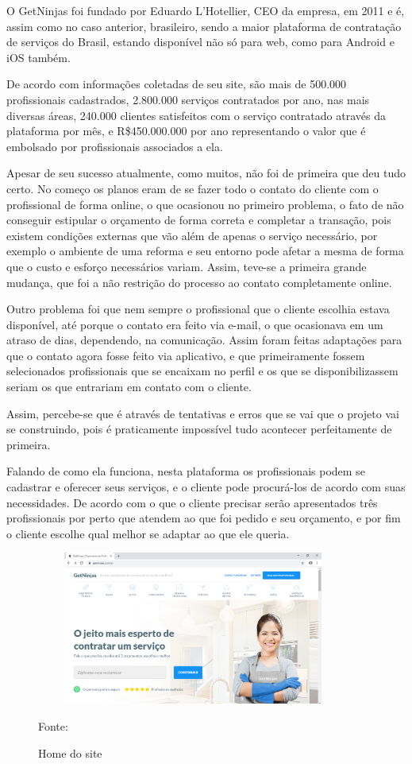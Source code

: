 O GetNinjas foi fundado por Eduardo L’Hotellier, CEO da empresa, em 2011 e é, assim como no caso anterior, brasileiro, sendo a maior plataforma de contratação de serviços do Brasil, estando disponível não só para web, como para Android e iOS também.

De acordo com informações coletadas de seu site, são mais de 500.000 profissionais cadastrados, 2.800.000 serviços contratados por ano, nas mais diversas áreas, 240.000 clientes satisfeitos com o serviço contratado através da plataforma por mês, e R\$450.000.000 por ano representando o valor que é embolsado por profissionais associados a ela.

Apesar de seu sucesso atualmente, como muitos, não foi de primeira que deu tudo certo. No começo os planos eram de se fazer todo o contato do cliente com o profissional de forma online, o que ocasionou no primeiro problema, o fato de não conseguir estipular o orçamento de forma correta e completar a transação, pois existem condições externas que vão além de apenas o serviço necessário, por exemplo o ambiente de uma reforma e seu entorno pode afetar a mesma de forma que o custo e esforço necessários variam. Assim, teve-se a primeira grande mudança, que foi a não restrição do processo ao contato completamente online.

Outro problema foi que nem sempre o profissional que o cliente escolhia estava disponível, até porque o contato era feito via e-mail, o que ocasionava em um atraso de dias, dependendo, na comunicação. Assim foram feitas adaptações para que o contato agora fosse feito via aplicativo, e que primeiramente fossem selecionados profissionais que se encaixam no perfil e os que se disponibilizassem seriam os que entrariam em contato com o cliente.

Assim, percebe-se que é através de tentativas e erros que se vai que o projeto vai se construindo, pois é praticamente impossível tudo acontecer perfeitamente de primeira.

Falando de como ela funciona, nesta plataforma os profissionais podem se cadastrar e oferecer seus serviços, e o cliente pode procurá-los de acordo com suas necessidades. De acordo com o que o cliente precisar serão apresentados três profissionais por perto que atendem ao que foi pedido e seu orçamento, e por fim o cliente escolhe qual melhor se adaptar ao que ele queria.

\begin{figure}[!h]
	\centering
	\caption{Home do site}
	\includegraphics[width=390px, height=190px]{./images/getninjas.png}
	\par {Fonte: \cite{get-ninjas}}
\end{figure}

